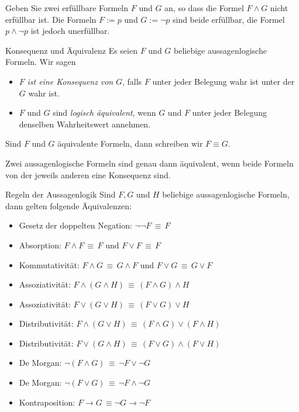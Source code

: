 \begin{example}
    Geben Sie zwei erfüllbare Formeln $F$ und $G$ an, so dass die Formel $F\land G$ nicht erfüllbar ist.
    \tcblower
    Die Formeln $F:=p$ und $G:=\neg p$ sind beide erfüllbar, die Formel $p\land \neg p$ ist jedoch unerfüllbar.
\end{example}

\begin{definition}{Konsequenz und Äquivalenz}
    Es seien $F$ und $G$ beliebige aussagenlogische Formeln. Wir sagen
    \begin{itemize}
        \item $F$ \textit{ist eine Konsequenz von }$G$, falls $F$ unter jeder Belegung wahr ist unter der $G$ wahr ist.
        \item $F$ und $G$ sind \textit{logisch äquivalent}, wenn $G$ und $F$ unter jeder Belegung denselben Wahrheitswert annehmen.
    \end{itemize}
    Sind $F$ und $G$ äquivalente Formeln, dann schreiben wir $F\equiv G$.
\end{definition}

\begin{remark}
    Zwei aussagenlogische Formeln sind genau dann äquivalent, wenn beide Formeln von der jeweils anderen eine Konsequenz sind.
\end{remark}

\begin{lemma}{Regeln der Aussagenlogik}
    Sind $F,G$ und $H$ beliebige aussagenlogische Formeln, dann gelten folgende Äquivalenzen:
    \begin{itemize}
        \item Gesetz der doppelten Negation: $\neg\neg F\,\equiv\, F$
        \item Absorption: $F\land F\,\equiv\, F$ und $F\lor F\,\equiv\, F$
        \item Kommutativität: $F\land G\,\equiv\,G\land F$ und $F\lor G\,\equiv\, G\lor F$
        \item Assoziativität: $F\land(G\land H)\,\equiv\,(F\land G)\land H$
        \item Assoziativität: $F\lor(G\lor H)\,\equiv\,(F\lor G)\lor H$
        \item Distributivität: $F\land(G\lor H)\,\equiv\,(F\land G)\lor (F\land H)$
        \item Distributivität: $F\lor(G\land H)\,\equiv\,(F\lor G)\land (F\lor H)$
        \item De Morgan: $\neg (F\land G)\,\equiv\,\neg F\lor\neg G$
        \item De Morgan: $\neg (F\lor G)\,\equiv\,\neg F\land \neg G$
        \item Kontraposition: $F\to G\,\equiv\neg G\to\neg F$
    \end{itemize}
\end{lemma}

